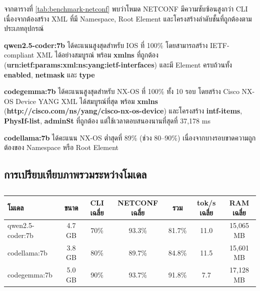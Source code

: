 \hspace*{1.3em}
จากตารางที่ \ref{tab:benchmark-netconf} พบว่าโหมด NETCONF มีความซับซ้อนสูงกว่า CLI เนื่องจากต้องสร้าง XML ที่มี Namespace, Root Element และโครงสร้างลำดับชั้นที่ถูกต้องตามประเภทอุปกรณ์

\hspace*{1.3em}
\textbf{qwen2.5-coder:7b} ได้คะแนนสูงสุดสำหรับ IOS ที่ 100\% โดยสามารถสร้าง IETF-compliant XML ได้อย่างสมบูรณ์ พร้อม \textbf{xmlns} ที่ถูกต้อง (\textbf{urn:ietf:params:xml:ns:yang:ietf-interfaces}) และมี Element ครบถ้วนทั้ง \textbf{enabled}, \textbf{netmask} และ \textbf{type}

\hspace*{1.3em}
\textbf{codegemma:7b} ได้คะแนนสูงสุดสำหรับ NX-OS ที่ 100\% ทั้ง 10 รอบ โดยสร้าง Cisco NX-OS Device YANG XML ได้สมบูรณ์ที่สุด พร้อม \textbf{xmlns} (\textbf{http://cisco.com/ns/yang/cisco-nx-os-device}) และโครงสร้าง \textbf{intf-items}, \textbf{PhysIf-list}, \textbf{adminSt} ที่ถูกต้อง แต่ใช้เวลาตอบสนองนานที่สุดที่ 37,178 ms

\hspace*{1.3em}
\textbf{codellama:7b} ได้คะแนน NX-OS ต่ำสุดที่ 89\% (ช่วง 80--90\%) เนื่องจากบางรอบขาดความถูกต้องของ Namespace หรือ Root Element

\subsection{การเปรียบเทียบภาพรวมระหว่างโมเดล}

\begin{table}[H]
    \caption{}
    \label{tab:benchmark-summary}
    \fontSixTeen
    \centering
    \begin{tabularx}{\textwidth}{|l|c|c|c|c|c|c|}
        \hline
        \textbf{โมเดล} & \textbf{ขนาด} & \textbf{CLI เฉลี่ย} & \textbf{NETCONF เฉลี่ย} & \textbf{รวม} & \textbf{tok/s เฉลี่ย} & \textbf{RAM เฉลี่ย} \\
        \hline
        qwen2.5-coder:7b & 4.7 GB & 70\% & 93.3\% & 81.7\% & 11.0 & 15,065 MB \\
        \hline
        codellama:7b & 3.8 GB & 80\% & 89.7\% & 84.8\% & 11.5 & 15,601 MB \\
        \hline
        codegemma:7b & 5.0 GB & 90\% & 93.7\% & 91.8\% & 7.7 & 17,128 MB \\
        \hline
    \end{tabularx}
\end{table}

